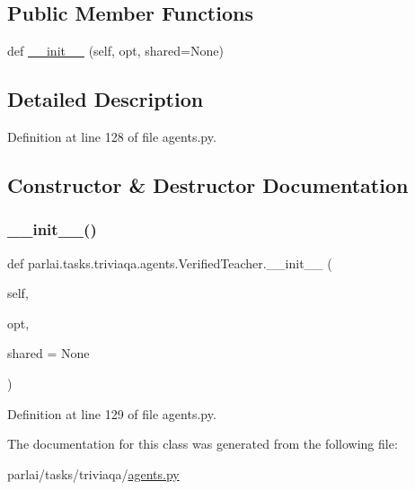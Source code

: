 \subsection*{Public Member Functions}
\begin{DoxyCompactItemize}
\item 
def \hyperlink{classparlai_1_1tasks_1_1triviaqa_1_1agents_1_1VerifiedTeacher_abef3ebd81d68d58d356a27bca5ec036c}{\+\_\+\+\_\+init\+\_\+\+\_\+} (self, opt, shared=None)
\end{DoxyCompactItemize}


\subsection{Detailed Description}


Definition at line 128 of file agents.\+py.



\subsection{Constructor \& Destructor Documentation}
\mbox{\label{classparlai_1_1tasks_1_1triviaqa_1_1agents_1_1VerifiedTeacher_abef3ebd81d68d58d356a27bca5ec036c}} 
\subsubsection{\texorpdfstring{\+\_\+\+\_\+init\+\_\+\+\_\+()}{\_\_init\_\_()}}
{\footnotesize\ttfamily def parlai.\+tasks.\+triviaqa.\+agents.\+Verified\+Teacher.\+\_\+\+\_\+init\+\_\+\+\_\+ (\begin{DoxyParamCaption}\item[{}]{self,  }\item[{}]{opt,  }\item[{}]{shared = {\ttfamily None} }\end{DoxyParamCaption})}



Definition at line 129 of file agents.\+py.



The documentation for this class was generated from the following file\+:\begin{DoxyCompactItemize}
\item 
parlai/tasks/triviaqa/\hyperlink{parlai_2tasks_2triviaqa_2agents_8py}{agents.\+py}\end{DoxyCompactItemize}
